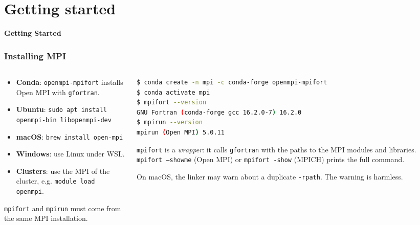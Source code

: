\section{Getting started}

\begin{frame}
  \centering
  \Huge \textbf{Getting Started}
\end{frame}


\begin{frame}[fragile]
  \frametitle{Installing MPI}
  \begin{columns}[T]
    \begin{column}{0.45\textwidth}
      \begin{itemize}
        \item \textbf{Conda}: \texttt{openmpi-mpifort} installs Open MPI with \texttt{gfortran}.
        \item \textbf{Ubuntu}: \texttt{sudo apt install} \\ \texttt{openmpi-bin libopenmpi-dev}
        \item \textbf{macOS}: \texttt{brew install open-mpi}
        \item \textbf{Windows}: use Linux under WSL.
        \item \textbf{Clusters}: use the MPI of the cluster, e.g. \texttt{module load openmpi}.
      \end{itemize}

      \vspace*{1mm}
      \texttt{mpifort} and \texttt{mpirun} must come from the same MPI installation.
    \end{column}

    \begin{column}{0.55\textwidth}
\begin{lstlisting}[language=bash]
$ conda create -n mpi -c conda-forge openmpi-mpifort
$ conda activate mpi
$ mpifort --version
GNU Fortran (conda-forge gcc 16.2.0-7) 16.2.0
$ mpirun --version
mpirun (Open MPI) 5.0.11
\end{lstlisting}

      \texttt{mpifort} is a \emph{wrapper}: it calls \texttt{gfortran} with the paths to the MPI modules and libraries. \texttt{mpifort --showme} (Open MPI) or \texttt{mpifort -show} (MPICH) prints the full command.

      \vspace*{1mm}
      \footnotesize On macOS, the linker may warn about a duplicate \texttt{-rpath}. The warning is harmless.
    \end{column}
  \end{columns}
\end{frame}


